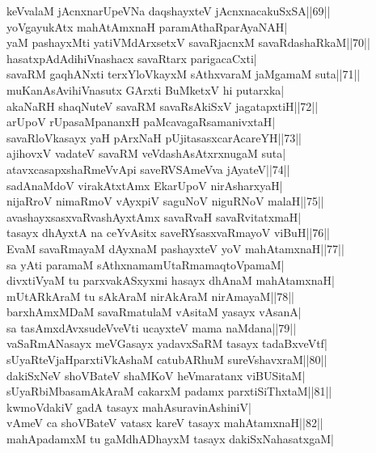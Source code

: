 \documentclass{article}
\begin{document}
keVvalaM jAcnxnarUpeVNa daqshayxteV jAcnxnacakuSxSA||69||\\
yoVgayukAtx mahAtAmxnaH paramAthaRparAyaNAH|\\
yaM pashayxMti yatiVMdArxsetxV savaRjacnxM savaRdashaRkaM||70||\\
hasatxpAdAdihiVnashacx savaRtarx parigacaCxti|\\
savaRM gaqhANxti terxYloVkayxM sAthxvaraM jaMgamaM suta||71||\\
muKanAsAvihiVnasutx GArxti BuMketxV hi putarxka|\\
akaNaRH shaqNuteV savaRM savaRsAkiSxV jagatapxtiH||72||\\
arUpoV rUpasaMpananxH paMcavagaRsamanivxtaH|\\
savaRloVkasayx yaH pArxNaH pUjitasasxcarAcareYH||73||\\
ajihovxV vadateV savaRM veVdashAsAtxrxnugaM suta|\\
atavxcasapxshaRmeVvApi saveRVSAmeVva jAyateV||74||\\
sadAnaMdoV virakAtxtAmx EkarUpoV nirAsharxyaH|\\
nijaRroV nimaRmoV vAyxpiV saguNoV niguRNoV malaH||75||\\
avashayxsasxvaRvashAyxtAmx savaRvaH savaRvitatxmaH|\\
tasayx dhAyxtA na ceYvAsitx saveRYsasxvaRmayoV viBuH||76||\\
EvaM savaRmayaM dAyxnaM pashayxteV yoV mahAtamxnaH||77||\\
sa yAti paramaM sAthxnamamUtaRmamaqtoVpamaM|\\
divxtiVyaM tu parxvakASxyxmi hasayx dhAnaM mahAtamxnaH|\\
mUtARkAraM tu sAkAraM nirAkAraM nirAmayaM||78||\\
barxhAmxMDaM savaRmatulaM vAsitaM yasayx vAsanA|\\
sa tasAmxdAvxsudeVveVti ucayxteV mama naMdana||79||\\
vaSaRmANasayx meVGasayx yadavxSaRM tasayx tadaBxveVtf|\\
sUyaRteVjaHparxtiVkAshaM catubARhuM sureVshavxraM||80||\\
dakiSxNeV shoVBateV shaMKoV heVmaratanx viBUSitaM|\\
sUyaRbiMbasamAkAraM cakarxM padamx parxtiSiThxtaM||81||\\
kwmoVdakiV gadA tasayx mahAsuravinAshiniV|\\
vAmeV ca shoVBateV vatasx kareV tasayx mahAtamxnaH||82||\\
mahApadamxM tu gaMdhADhayxM tasayx dakiSxNahasatxgaM|\\
\end{document}
